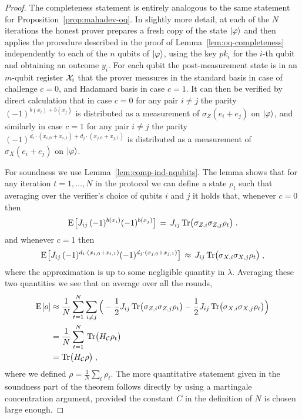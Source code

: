 \begin{proof}
The completeness statement is entirely analogous to the same statement for Proposition~\ref{prop:mahadev-oq}. In slightly more detail, at each of the $N$ iterations the honest prover prepares a fresh copy of the state $|\varphi\rangle$ and then applies the procedure described in the proof of Lemma~\ref{lem:oq-completeness} independently to each of the $n$ qubits of $|\varphi\rangle$, using the key $pk_i$ for the $i$-th qubit and obtaining an outcome $y_i$. For each qubit the post-measurement state is in an $m$-qubit register $\mathcal{X}_i$ that the prover measures in the standard basis in case of challenge $c=0$, and Hadamard basis in case $c=1$. 
It can then be verified by direct calculation that in case $c=0$ for any pair $i\neq j$ the parity $(-1)^{b(x_i)+b(x_j)}$ is distributed as a measurement of $\sigma_Z(e_i+e_j)$ on $|\varphi\rangle$, and similarly in case $c=1$ for any pair $i\neq j$ the parity $(-1)^{d_i\cdot( x_{i,0} + x_{i,1}) + d_j\cdot(x_{j,0} + x_{j,1})}$ is distributed as a measurement of $\sigma_X(e_i+e_j)$ on $|\varphi\rangle$. 

For soundness we use Lemma~\ref{lem:comp-ind-nqubits}. The lemma shows that for any iteration $t=1,\ldots,N$ in the protocol we can define a state $\rho_t$ such that averaging over the verifier's choice of qubits $i$ and $j$ it holds that, whenever $c=0$ then 
\[\textsc{E}_{}\big[ J_{ij}\, (-1)^{b(x_i)} (-1)^{b(x_j)}\big]\,= \, J_{ij}\,\mbox{\rm Tr}\big( \sigma_{Z,i}\sigma_{Z,j}  \rho_t \big)\;.\]
and whenever $c=1$ then 
\[\textsc{E}_{}\big[ J_{ij}\, (-1)^{d_i\cdot( x_{i,0}+x_{i,1})} (-1)^{d_j\cdot( x_{j,0}+x_{j,1})} \big]\,\approx \, J_{ij}\,\mbox{\rm Tr}\big( \sigma_{X,i}\sigma_{X,j}  \rho_t \big)\;,\]
where the approximation is up to some negligible quantity in $\lambda$. Averaging these two quantities we see that on average over all the rounds, 
\begin{align*}
\textsc{E}_{}[o] &\approx  \frac{1}{N} \sum_{t=1}^N  \sum_{i\neq j} \Big( -\frac{1}{2} J_{ij}\,\mbox{\rm Tr}\big( \sigma_{Z,i}\sigma_{Z,j}  \rho_t \big) - \frac{1}{2} J_{ij}\,\mbox{\rm Tr}\big( \sigma_{X,i}\sigma_{X,j}  \rho_t \big)\Big)\\
& = \frac{1}{N} \sum_{t=1}^N \,\mbox{\rm Tr}\big( H_{\mathcal{C}} \rho_t \big)\\
&=  \mbox{\rm Tr}\big( H_{\mathcal{C}} \rho \big)\;,
\end{align*}
where we defined $\rho = \frac{1}{N}\sum_t \rho_t$. The more quantitative statement given in the soundness part of the theorem follows directly by using a martingale concentration argument, provided the constant $C$ in the definition of $N$ is chosen large enough. 
\end{proof}


